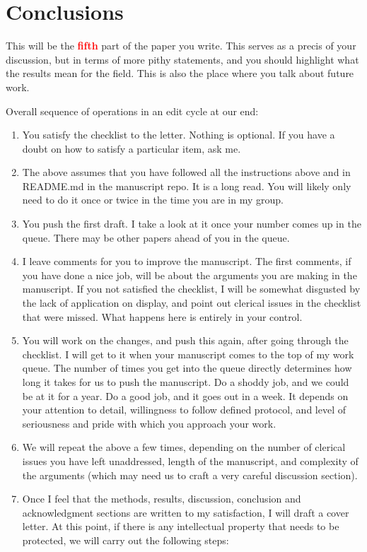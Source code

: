 \documentclass[12pt,twocolumn]{article}
\begin{document}
\section{Conclusions}
\label{sec:conclusions}

This will be the \textbf{\Huge \textcolor{red}{fifth}} part of the paper you write. This serves as a precis of your discussion, but in terms of more pithy statements, and you should highlight what the results mean for the field. This is also the place where you talk about future work.

Overall sequence of operations in an edit cycle at our end:

\begin{enumerate}
\item You satisfy the checklist to the letter. Nothing is optional. If you have a doubt on how to satisfy a particular item, ask me.
\item The above assumes that you have followed all the instructions above and in README.md in the manuscript repo. It is a long read. You will likely only need to do it once or twice in the time you are in my group.
\item You push the first draft. I take a look at it once your number comes up in the queue. There may be other papers ahead of you in the queue.
\item I leave comments for you to improve the manuscript. The first comments, if you have done a nice job, will be about the arguments you are making in the manuscript. If you not satisfied the checklist, I will be somewhat disgusted by the lack of application on display, and point out clerical issues in the checklist that were missed. What happens here is entirely in your control.
\item You will work on the changes, and push this again, after going through the checklist. I will get to it when your manuscript comes to the top of my work queue. The number of times you get into the queue directly determines how long it takes for us to push the manuscript. Do a shoddy job, and we could be at it for a year. Do a good job, and it goes out in a week. It depends on your attention to detail, willingness to follow defined protocol, and level of seriousness and pride with which you approach your work.
\item We will repeat the above a few times, depending on the number of clerical issues you have left unaddressed, length of the manuscript, and complexity of the arguments (which may need us to craft a very careful discussion section).
\item Once I feel that the methods, results, discussion, conclusion and acknowledgment sections are written to my satisfaction, I will draft a cover letter. At this point, if there is any intellectual property that needs to be protected, we will carry out the following steps:


\end{enumerate}
\end{document}

